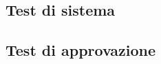 \documentclass[a4paper, oneside, openany, dvipsnames, table]{article}
\begin{document}
\subsection{Test di sistema}
	
\subsection{Test di approvazione}
	
	
% 		
% 		
\end{document}
